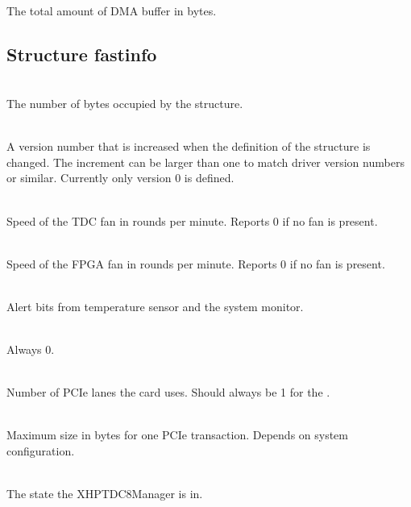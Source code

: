 \\
The total amount of DMA buffer in bytes.


\subsection{Structure \prefix fast\tu info}
\label{structfastinfo}
\\
The number of bytes occupied by the structure. \par

\\
A version number that is increased when the definition of the structure is changed. 
The increment can be larger than one to match driver version numbers or similar. 
Currently only version 0 is defined.\par

\ifxHPTDC{} {
    \\
    Speed of the TDC fan in rounds per minute. Reports 0 if no fan is present.\par
}
\\
Speed of the FPGA fan in rounds per minute. Reports 0 if no fan is present.\par

\\
Alert bits from temperature sensor and the system monitor.
\par

\\
Always 0. \par

\\
Number of PCIe lanes the card uses. Should always be 1 for the \deviceName. \par

\\
Maximum size in bytes for one PCIe transaction. Depends on system configuration.\par

\\
The state the XHPTDC8Manager is in.

